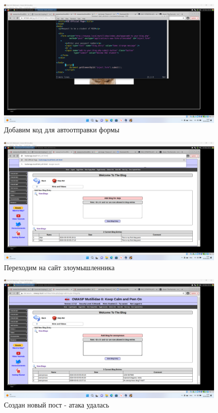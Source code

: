 \documentclass[a4paper]{article}
\begin{document}
  \begin{figure}[H]
    \centering
    \includegraphics[width=\textwidth]{Screenshot_55}
    \caption{Добавим код для автоотправки формы}
  \end{figure}

  \begin{figure}[H]
    \centering
    \includegraphics[width=\textwidth]{Screenshot_56}
    \caption{Переходим на сайт злоумышленника}
  \end{figure}

  \begin{figure}[H]
    \centering
    \includegraphics[width=\textwidth]{Screenshot_57}
    \caption{Создан новый пост - атака удалась}
  \end{figure}
\end{document}
